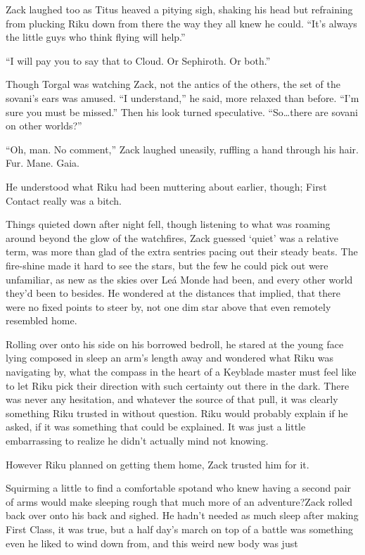 Zack laughed too as Titus heaved a pitying sigh, shaking his head but refraining from plucking Riku down from there the way they all knew he could. ``It's always the little guys who think flying will help.''

``I will pay you to say that to Cloud. Or Sephiroth. Or both.''

Though Torgal was watching Zack, not the antics of the others, the set of the sovani's ears was amused. ``I understand,'' he said, more relaxed than before. ``I'm sure you must be missed.'' Then his look turned speculative. ``So\ldots there are sovani on other worlds?''

``Oh, man. No comment,'' Zack laughed uneasily, ruffling a hand through his hair. Fur. Mane. Gaia.

He understood what Riku had been muttering about earlier, though; First Contact really was a bitch.

Things quieted down after night fell, though listening to what was roaming around beyond the glow of the watchfires, Zack guessed `quiet' was a relative term, was more than glad of the extra sentries pacing out their steady beats. The fire-shine made it hard to see the stars, but the few he could pick out were unfamiliar, as new as the skies over Leá Monde had been, and every other world they'd been to besides. He wondered at the distances that implied, that there were no fixed points to steer by, not one dim star above that even remotely resembled home.

Rolling over onto his side on his borrowed bedroll, he stared at the young face lying composed in sleep an arm's length away and wondered what Riku was navigating by, what the compass in the heart of a Keyblade master must feel like to let Riku pick their direction with such certainty out there in the dark. There was never any hesitation, and whatever the source of that pull, it was clearly something Riku trusted in without question. Riku would probably explain if he asked, if it was something that could be explained. It was just a little embarrassing to realize he didn't actually mind not knowing.

However Riku planned on getting them home, Zack trusted him for it.

Squirming a little to find a comfortable spot\textemdash and who knew having a second pair of arms would make sleeping rough that much more of an adventure?\textemdash Zack rolled back over onto his back and sighed. He hadn't needed as much sleep after making First Class, it was true, but a half day's march on top of a battle was something even he liked to wind down from, and this weird new body was just\textemdash 

